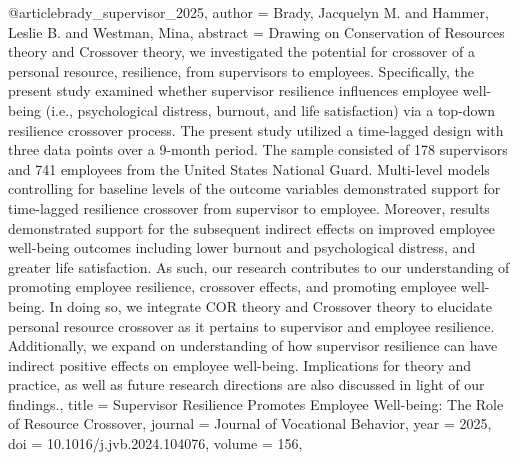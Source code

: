 @article{brady_supervisor_2025,
  author = {Brady, Jacquelyn M. and Hammer, Leslie B. and Westman, Mina},
  abstract = {Drawing on Conservation of Resources theory and Crossover theory, we investigated the potential for crossover of a personal resource, resilience, from supervisors to employees. Specifically, the present study examined whether supervisor resilience influences employee well-being (i.e., psychological distress, burnout, and life satisfaction) via a top-down resilience crossover process. The present study utilized a time-lagged design with three data points over a 9-month period. The sample consisted of 178 supervisors and 741 employees from the United States National Guard. Multi-level models controlling for baseline levels of the outcome variables demonstrated support for time-lagged resilience crossover from supervisor to employee. Moreover, results demonstrated support for the subsequent indirect effects on improved employee well-being outcomes including lower burnout and psychological distress, and greater life satisfaction. As such, our research contributes to our understanding of promoting employee resilience, crossover effects, and promoting employee well-being. In doing so, we integrate COR theory and Crossover theory to elucidate personal resource crossover as it pertains to supervisor and employee resilience. Additionally, we expand on understanding of how supervisor resilience can have indirect positive effects on employee well-being. Implications for theory and practice, as well as future research directions are also discussed in light of our findings.},
  title = {{Supervisor} {Resilience} {Promotes} {Employee} {Well-being}: {The} {Role} {of} {Resource} {Crossover}},
  journal = {Journal of Vocational Behavior},
  year = {2025},
  doi = {10.1016/j.jvb.2024.104076},
  volume = {156},
}

